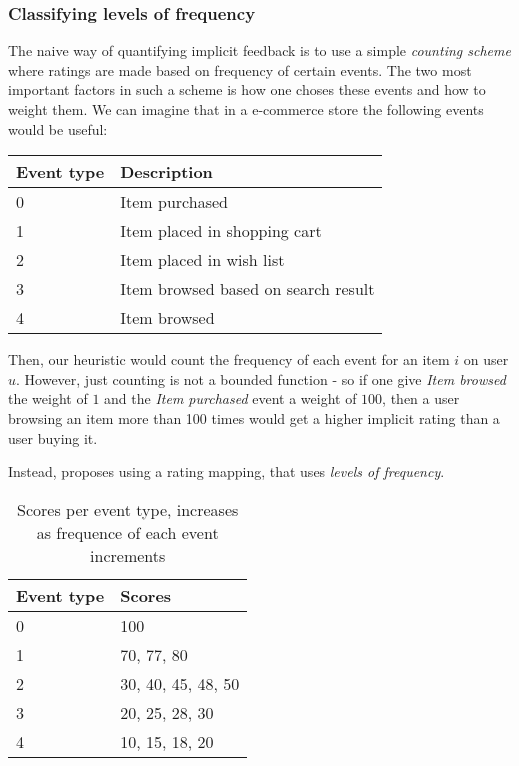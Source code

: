 \subsubsection{Classifying levels of frequency}

The naive way of quantifying implicit feedback is to use a simple
\textit{counting scheme} where ratings are made based on frequency of certain
events. The two most important factors in such a scheme is how one choses these
events and how to weight them. We can imagine that in a e-commerce store the
following events would be useful:

\begin{table}[H]
  \centering
  \begin{tabular}{|l|l|}
  \hline
  Event type & Description \\ \hline
  0 & Item purchased \\
  1 & Item placed in shopping cart \\
  2 & Item placed in wish list \\
  3 & Item browsed based on search result \\
  4 & Item browsed \\
  \hline
  \end{tabular}
\end{table}

Then, our heuristic would count the frequency of each event for an item $i$ on
user $u$. However, just counting is not a bounded function - so if one give
\textit{Item browsed} the weight of $1$ and the \textit{Item purchased} event
a weight of $100$, then a user browsing an item more than 100 times would get a
higher implicit rating than a user buying it.

Instead, \cite{pkghost2014implicit} proposes using a rating mapping, that uses
\textit{levels of frequency}.

\begin{table}[H]
  \centering
  \begin{tabular}{|l|l|}
  \hline
  Event type & Scores \\ \hline
  0 & 100 \\
  1 & 70, 77, 80 \\
  2 & 30, 40, 45, 48, 50 \\
  3 & 20, 25, 28, 30 \\
  4 & 10, 15, 18, 20 \\
  \hline
  \end{tabular}
  \caption{Scores per event type, increases as frequence of each event
           increments}
  \label{implicit-table}
\end{table}

